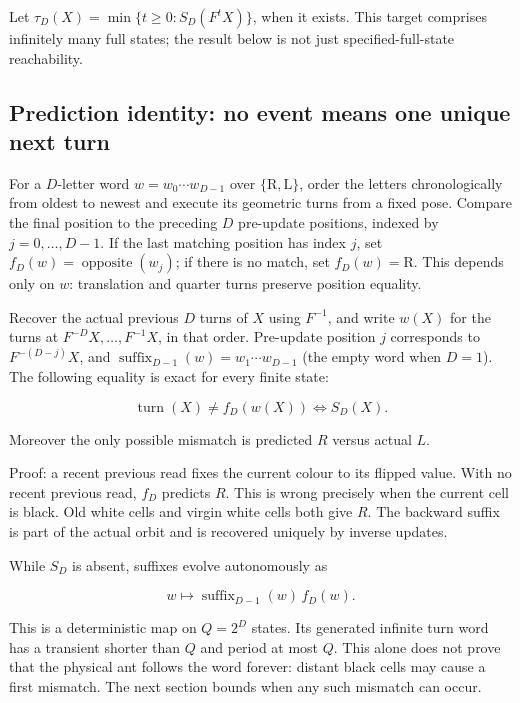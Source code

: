 \documentclass[
  11pt,
]{article}
\begin{document}
Let $\tau_D(X)=\min\{t\ge0:S_D(F^tX)\}$, when it exists.
This target comprises infinitely many full states; the result below is
not just specified-full-state reachability.

\subsection{Prediction identity: no event means one unique next
turn}\label{sm-2}

For a \(D\)-letter word \(w=w_0\cdots w_{D-1}\) over
\(\{\mathrm R,\mathrm L\}\), order the letters chronologically from oldest
to newest and execute its geometric turns from a fixed pose. Compare the
final position to the preceding \(D\) pre-update positions, indexed by
\(j=0,\ldots,D-1\). If the last matching position has index \(j\), set
\(f_D(w)=\operatorname{opposite}(w_j)\); if there is no match, set
\(f_D(w)=\mathrm R\). This depends only on \(w\): translation and quarter
turns preserve position equality.

Recover the actual previous \(D\) turns of \(X\) using \(F^{-1}\), and
write \(w(X)\) for the turns at \(F^{-D}X,\ldots,F^{-1}X\), in that order.
Pre-update position \(j\) corresponds to \(F^{-(D-j)}X\), and
\(\operatorname{suffix}_{D-1}(w)=w_1\cdots w_{D-1}\) (the empty word when
\(D=1\)). The following equality is exact for every finite state:

\begin{equation}\label{eq:sm2}
\operatorname{turn}(X)\ne f_D(w(X))\iff S_D(X).
\end{equation}

Moreover the only possible mismatch is predicted \(R\) versus actual \(L\).

Proof: a recent previous read fixes the current colour to its flipped
value. With no recent previous read, $f_D$ predicts \(R\). This is wrong
precisely when the current cell is black. Old white cells and virgin
white cells both give \(R\). The backward suffix is part of the actual
orbit and is recovered uniquely by inverse updates.

While $S_D$ is absent, suffixes evolve autonomously as

\[
w\longmapsto\operatorname{suffix}_{D-1}(w)\,f_D(w).
\]

This is a deterministic map on $Q=2^D$ states. Its generated infinite
turn word has a transient shorter than \(Q\) and period at most \(Q\). This
alone does not prove that the physical ant follows the word forever:
distant black cells may cause a first mismatch. The next section bounds
when any such mismatch can occur.
\end{document}
